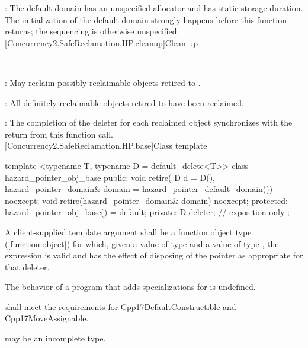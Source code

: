 \pnum
{}: The default domain has an unspecified allocator and has static storage
duration. The initialization of the default domain strongly happens before this function
returns; the sequencing is otherwise unspecified.
\\

[Concurrency2.SafeReclamation.HP.cleanup]{Clean up}

\\
\hspace*{1.1em}

\pnum
{}: May reclaim possibly-reclaimable objects retired to .

\pnum
{}: All definitely-reclaimable objects retired to  have been reclaimed.

\pnum
{}: The completion of the deleter for each reclaimed object synchronizes
with the return from this function call.
\\

[Concurrency2.SafeReclamation.HP.base]{Class template }

\begin{codeblock}
template <typename T, typename D = default_delete<T>>
class hazard_pointer_obj_base {
public:
  void retire(
    D d = D(),
    hazard_pointer_domain& domain = hazard_pointer_default_domain()) noexcept;
  void retire(hazard_pointer_domain& domain) noexcept;
protected:
  hazard_pointer_obj_base() = default;
private:
  D deleter; // exposition only
};
\end{codeblock}

\pnum
A client-supplied template argument  shall be a function object type ([function.object])
for which, given a value  of type  and a value  of type , the expression  is valid and has the effect of disposing of the pointer as appropriate for that deleter.

\pnum
The behavior of a program that adds specializations for  is undefined.

\pnum
{} shall meet the requirements for Cpp17DefaultConstructible and Cpp17MoveAssignable.

\pnum
{} may be an incomplete type.
\\


